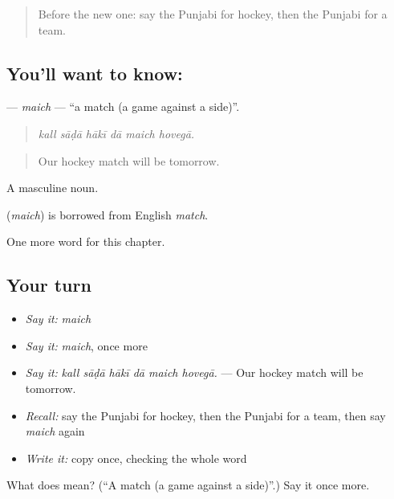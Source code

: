 \begin{quote}
Before the new one: say the Punjabi for hockey, then the Punjabi for a team.
\end{quote}

\subsection*{You'll want to know: }
\textbf{} — \emph{maich} — \textquotedblleft{}a match (a game against a side)\textquotedblright{}.

\begin{quote}
     
\end{quote}

\begin{quote}
\emph{kall sāḍā hākī dā maich hovegā.}
\end{quote}

\begin{quote}
Our hockey match will be tomorrow.
\end{quote}

A masculine noun.

\begin{cousinweb}
\textbf{} (\emph{maich}) is borrowed from English \emph{match}.
\end{cousinweb}

\begin{grammarlens}[title={What you've built}]
One more word for this chapter.
\end{grammarlens}

\subsection*{Your turn}
\begin{itemize}
\raggedright
  \item \emph{Say it:} \emph{maich}
  \item \emph{Say it:} \emph{maich}, once more
  \item \emph{Say it:} \emph{kall sāḍā hākī dā maich hovegā.} — Our hockey match will be tomorrow.
  \item \emph{Recall:} say the Punjabi for hockey, then the Punjabi for a team, then say \emph{maich} again
  \item \emph{Write it:} copy \textbf{} once, checking the whole word
\end{itemize}

\begin{tcolorbox}[breakable,colback=teal!4,colframe=teal!35!black,title={Before you move on}]
What does  mean? (\textquotedblleft{}A match (a game against a side)\textquotedblright{}.) Say it once more.
\end{tcolorbox}
